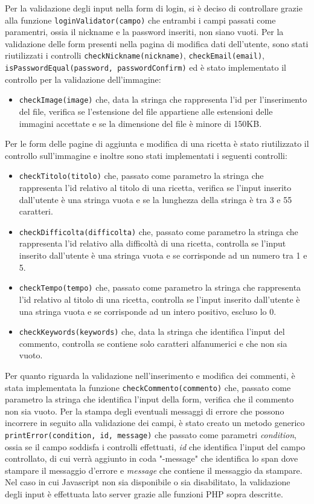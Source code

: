 Per la validazione degli input nella form di login, si è deciso di controllare grazie alla funzione \texttt{loginValidator(campo)} che entrambi i campi passati come paramentri, ossia il nickname e la password inseriti, non siano vuoti. \newline
Per la validazione delle form presenti nella pagina di modifica dati dell'utente, sono stati riutilizzati i controlli \texttt{checkNickname(nickname)}, \texttt{checkEmail(email)}, \texttt{isPasswordEqual(password, passwordConfirm)} ed è stato implementato il controllo per la validazione dell'immagine:
\begin{itemize}
	\item \texttt{checkImage(image)} che, data la stringa che rappresenta l'id per l'inserimento del file, verifica se l'estensione del file appartiene alle estensioni delle immagini accettate e se la dimensione del file è minore di 150KB.
\end{itemize}
Per le form delle pagine di aggiunta e modifica di una ricetta è stato riutilizzato il controllo sull'immagine e inoltre sono stati implementati i seguenti controlli:
\begin{itemize}
	\item \texttt{checkTitolo(titolo)} che, passato come parametro la stringa che rappresenta l'id relativo al titolo di una ricetta, verifica se l'input inserito dall'utente è una stringa vuota e se la lunghezza della stringa è tra 3 e 55 caratteri.
	\item \texttt{checkDifficolta(difficolta)} che, passato come parametro la stringa che rappresenta l'id relativo alla difficoltà di una ricetta, controlla se l'input inserito dall'utente è una stringa vuota e se corrisponde ad un numero tra 1 e 5.
	\item \texttt{checkTempo(tempo)} che, passato come parametro la stringa che rappresenta l'id relativo al titolo di una ricetta, controlla se l'input inserito dall'utente è una stringa vuota e se corrisponde ad un intero positivo, escluso lo 0.
	\item \texttt{checkKeywords(keywords)} che, data la stringa che identifica l'input del commento, controlla se contiene solo caratteri alfanumerici e che non sia vuoto.
\end{itemize}
Per quanto riguarda la validazione nell'inserimento e modifica dei commenti, è stata implementata la funzione \texttt{checkCommento(commento)} che, passato come parametro la stringa che identifica l'input della form, verifica che il commento non sia vuoto. \newline
Per la stampa degli eventuali messaggi di errore che possono incorrere in seguito alla validazione dei campi, è stato creato un metodo generico \texttt{printError(condition, id, message)} che passato come parametri \textit{condition}, ossia se il campo soddisfa i controlli effettuati, \textit{id} che identifica l'input del campo controllato, di cui verrà aggiunto in coda "-message" che identifica lo span dove stampare il messaggio d'errore e \textit{message} che contiene il messaggio da stampare.
Nel caso in cui Javascript non sia disponibile o sia disabilitato, la validazione degli input è effettuata lato server grazie alle funzioni PHP sopra descritte.

